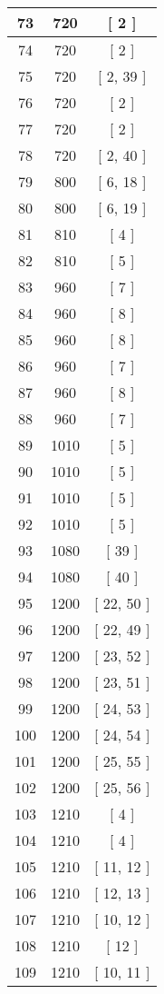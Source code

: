 \begin{center}
\begin{longtable}[H]{|| c c c ||}
73 & 720 & [ 2 ] \\ 
\hline
74 & 720 & [ 2 ] \\ 
\hline
75 & 720 & [ 2, 39 ] \\ 
\hline
76 & 720 & [ 2 ] \\ 
\hline
77 & 720 & [ 2 ] \\ 
\hline
78 & 720 & [ 2, 40 ] \\ 
\hline
79 & 800 & [ 6, 18 ] \\ 
\hline
80 & 800 & [ 6, 19 ] \\ 
\hline
81 & 810 & [ 4 ] \\ 
\hline
82 & 810 & [ 5 ] \\ 
\hline
83 & 960 & [ 7 ] \\ 
\hline
84 & 960 & [ 8 ] \\ 
\hline
85 & 960 & [ 8 ] \\ 
\hline
86 & 960 & [ 7 ] \\ 
\hline
87 & 960 & [ 8 ] \\ 
\hline
88 & 960 & [ 7 ] \\ 
\hline
89 & 1010 & [ 5 ] \\ 
\hline
90 & 1010 & [ 5 ] \\ 
\hline
91 & 1010 & [ 5 ] \\ 
\hline
92 & 1010 & [ 5 ] \\ 
\hline
93 & 1080 & [ 39 ] \\ 
\hline
94 & 1080 & [ 40 ] \\ 
\hline
95 & 1200 & [ 22, 50 ] \\ 
\hline
96 & 1200 & [ 22, 49 ] \\ 
\hline
97 & 1200 & [ 23, 52 ] \\ 
\hline
98 & 1200 & [ 23, 51 ] \\ 
\hline
99 & 1200 & [ 24, 53 ] \\ 
\hline
100 & 1200 & [ 24, 54 ] \\ 
\hline
101 & 1200 & [ 25, 55 ] \\ 
\hline
102 & 1200 & [ 25, 56 ] \\ 
\hline
103 & 1210 & [ 4 ] \\ 
\hline
104 & 1210 & [ 4 ] \\ 
\hline
105 & 1210 & [ 11, 12 ] \\ 
\hline
106 & 1210 & [ 12, 13 ] \\ 
\hline
107 & 1210 & [ 10, 12 ] \\ 
\hline
108 & 1210 & [ 12 ] \\ 
\hline
109 & 1210 & [ 10, 11 ] \\ 

\end{longtable}
\end{center}
